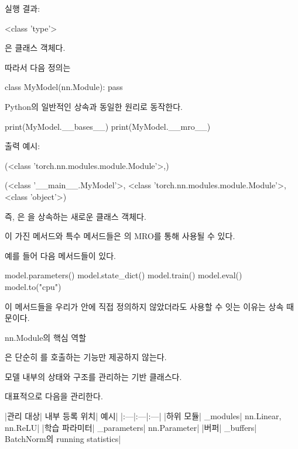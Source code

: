 실행 결과:

\begin{dhkzsh}
<class 'type'>
\end{dhkzsh}

은 클래스 객체다.

따라서 다음 정의는

\begin{dhkcode}
class MyModel(nn.Module):
    pass
\end{dhkcode}

Python의 일반적인 상속과 동일한 원리로 동작한다.

\begin{dhkcode}
print(MyModel.__bases__)
print(MyModel.__mro__)
\end{dhkcode}

출력 예시:

\begin{dhkzsh}
(<class 'torch.nn.modules.module.Module'>,)

(<class '__main__.MyModel'>,
 <class 'torch.nn.modules.module.Module'>,
 <class 'object'>)
\end{dhkzsh}

즉, 은 을 상속하는 새로운 클래스 객체다.

이 가진 메서드와 특수 메서드들은 의 MRO를 통해 사용될 수 있다.

예를 들어 다음 메서드들이 있다.

\begin{dhkcode}
model.parameters()
model.state_dict()
model.train()
model.eval()
model.to("cpu")
\end{dhkcode}

이 메서드들을 우리가  안에 직접 정의하지 않았더라도 사용할 수 잇는 이유는 상속 때문이다.

\begin{dhknote}
\begin{dhksmry}[centered]
nn.Module의 핵심 역할
\end{dhksmry}
\end{dhknote}

은 단순히 를 호출하는 기능만 제공하지 않는다.

모델 내부의 상태와 구조를 관리하는 기반 클래스다.

대표적으로 다음을 관리한다.

\begin{dhktable}
|관리 대상|	내부 등록 위치|	예시|
|:---|:---|:---|
|하위 모듈|	_modules|	nn.Linear, nn.ReLU|
|학습 파라미터|	_parameters|	nn.Parameter|
|버퍼|	_buffers|	BatchNorm의 running statistics|
\end{dhktable}

